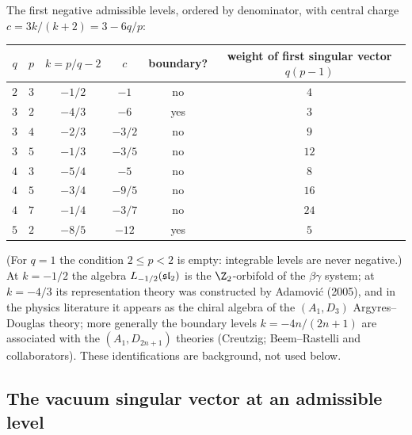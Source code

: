 \begin{example}\label{l09:ex:levels}
The first negative admissible levels, ordered by denominator, with central charge
$c = 3k/(k+2) = 3 - 6q/p$:
\begin{center}
\begin{tabular}{cccccc}
\toprule
$q$ & $p$ & $k = p/q-2$ & $c$ & boundary? & weight of first singular vector $q(p-1)$\\
\midrule
$2$ & $3$ & $-1/2$ & $-1$ & no & $4$\\
$3$ & $2$ & $-4/3$ & $-6$ & yes & $3$\\
$3$ & $4$ & $-2/3$ & $-3/2$ & no & $9$\\
$3$ & $5$ & $-1/3$ & $-3/5$ & no & $12$\\
$4$ & $3$ & $-5/4$ & $-5$ & no & $8$\\
$4$ & $5$ & $-3/4$ & $-9/5$ & no & $16$\\
$4$ & $7$ & $-1/4$ & $-3/7$ & no & $24$\\
$5$ & $2$ & $-8/5$ & $-12$ & yes & $5$\\
\bottomrule
\end{tabular}
\end{center}
(For $q = 1$ the condition $2\le p<2$ is empty: integrable levels are never negative.) At
$k=-1/2$ the algebra $L_{-1/2}(\mathfrak{sl}_2)$ is the $\Z_2$-orbifold of the $\beta\gamma$ system; at
$k=-4/3$ its representation theory was constructed by Adamovi\'c (2005), and in
the physics literature it appears as the chiral algebra of the $(A_1,D_3)$ Argyres--Douglas theory;
more generally the boundary levels $k = -4n/(2n+1)$ are associated with the $(A_1,D_{2n+1})$
theories (Creutzig; Beem--Rastelli and collaborators). These identifications are background, not
used below.
\end{example}

\subsection{The vacuum singular vector at an admissible level}

